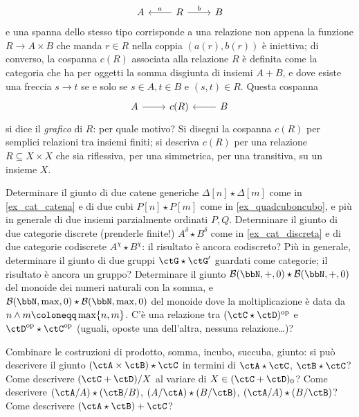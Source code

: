 \begin{esercizi}
	\[
		\begin{tikzcd}
			A & R \ar[r, "b"]\ar[l, "a"']& B
		\end{tikzcd}
	\]
	e una spanna dello stesso tipo corrisponde a una relazione non appena la funzione \(R \to A\times B\) che manda \(r\in R\) nella coppia \((a(r),b(r))\) è iniettiva; di converso, la cospanna \(c(R)\) associata alla relazione \(R\) è definita come la categoria che ha per oggetti la somma disgiunta di insiemi \(A+B\), e dove esiste una freccia \(s\to t\) se e solo se \(s\in A,t\in B\) e \((s,t)\in R\). Questa cospanna
	\[
		\begin{tikzcd}
			A \ar[r] & c(R) & \ar[l] B
		\end{tikzcd}
	\]
	si dice il \emph{grafico} di \(R\): per quale motivo? Si disegni la cospanna \(c(R)\) per semplici relazioni tra insiemi finiti; si descriva \(c(R)\) per una relazione \(R\subseteq X\times X\) che sia riflessiva, per una simmetrica, per una transitiva, su un insieme \(X\).
	\item Determinare il giunto di due catene generiche \(\Delta[n] \star \Delta[m]\) come in \ref{ex_cat_catena} e di due cubi \(P[n] \star P[m]\) come in \ref{ex_quadcuboncubo}, e più in generale di due insiemi parzialmente ordinati \(P,Q\). Determinare il giunto di due categorie discrete (prenderle finite!) \(A^\delta \star B^\delta\) come in \ref{ex_cat_discreta} e di due categorie codiscrete \(A^\chi \star B^\chi\): il risultato è ancora codiscreto? Più in generale, determinare il giunto di due gruppi \(\ctG \star \ctG'\) guardati come categorie; il risultato è ancora un gruppo? Determinare il giunto \(\susp(\bbN,+,0) \star \susp(\bbN,+,0)\) del monoide dei numeri naturali con la somma, e \(\susp(\bbN,\max,0) \star \susp(\bbN,\max,0)\) del monoide dove la moltiplicazione è data da \(n\land m \defeq \max\{n,m\}\). C'è una relazione tra \((\ctC\star\ctD)^\op\) e \(\ctD^\op\star\ctC^\op\) (uguali, oposte una dell'altra, nessuna relazione\dots)?
	\item Combinare le costruzioni di prodotto, somma, incubo, succuba, giunto: si può descrivere il giunto \((\ctA\times\ctB)\star\ctC\) in termini di \(\ctA\star\ctC\), \(\ctB\star\ctC\)? Come descrivere \((\ctC+\ctD)/X\) al variare di \(X\in(\ctC+\ctD)_0\)? Come descrivere \((\ctA/A)\star(\ctB/B)\), \((A/\ctA)\star(B/\ctB)\), \((\ctA/A)\star(B/\ctB)\)? Come descrivere \((\ctA\star\ctB)+\ctC\)?
\end{esercizi}
